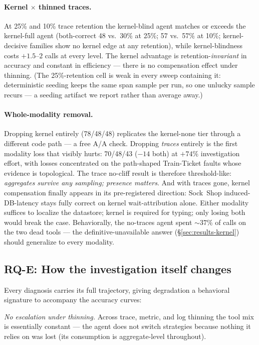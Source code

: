 \paragraph{Kernel $\times$ thinned traces.} At 25\% and 10\% trace retention the
kernel-blind agent matches or exceeds the kernel-full agent (both-correct 48 vs.\ 30\%
at 25\%; 57 vs.\ 57\% at 10\%; kernel-decisive families show no kernel edge at any
retention), while kernel-blindness costs $+1.5$--$2$ calls at every level. The kernel
advantage is retention-\emph{invariant} in accuracy and constant in efficiency ---
there is no compensation effect under thinning. (The 25\%-retention cell is weak in
every sweep containing it: deterministic seeding keeps the same span sample per run,
so one unlucky sample recurs --- a seeding artifact we report rather than average
away.)

\paragraph{Whole-modality removal.} Dropping kernel entirely (78/48/48) replicates
the kernel-none tier through a different code path --- a free A/A check. Dropping
\emph{traces} entirely is the first modality loss that visibly hurts: 70/48/43
($-14$ both) at $+74\%$ investigation effort, with losses concentrated on the
path-shaped Train-Ticket faults whose evidence is topological. The trace no-cliff
result is therefore threshold-like: \emph{aggregates survive any sampling; presence
matters}. And with traces gone, kernel compensation finally appears in its
pre-registered direction: Sock~Shop induced-DB-latency stays fully correct on kernel
wait-attribution alone. Either modality suffices to localize the datastore; kernel is
required for typing; only losing both would break the case. Behaviorally, the
no-traces agent spent ${\sim}37\%$ of calls on the two dead tools --- the
definitive-unavailable answer (\S\ref{sec:results-kernel}) should generalize to every
modality.

\subsection{RQ-E: How the investigation itself changes}
\label{sec:results-behavior}

Every diagnosis carries its full trajectory, giving degradation a behavioral
signature to accompany the accuracy curves:

\emph{No escalation under thinning.} Across trace, metric, and log thinning the tool
mix is essentially constant --- the agent does not switch strategies because nothing
it relies on was lost (its consumption is aggregate-level throughout).

